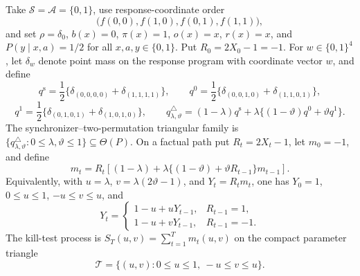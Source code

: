 Take \(\mathcal S=\mathcal A=\{0,1\}\), use response-coordinate order
\[
 \bigl(f(0,0),f(1,0),f(0,1),f(1,1)\bigr),
\]
and set \(\rho=\delta_0\), \(b(x)=0\), \(\pi(x)=1\), \(o(x)=x\), \(r(x)=x\), and \(P(y\mid x,a)=1/2\) for all \(x,a,y\in\{0,1\}\).  Put \(R_0=2X_0-1=-1\).  For \(w\in\{0,1\}^4\), let \(\delta_w\) denote point mass on the response program with coordinate vector \(w\), and define
\[
 q^{\mathrm s}=\frac12\{\delta_{(0,0,0,0)}+\delta_{(1,1,1,1)}\},\qquad
 q^{0}=\frac12\{\delta_{(0,0,1,0)}+\delta_{(1,1,0,1)}\},
\]
\[
 q^{1}=\frac12\{\delta_{(0,1,0,1)}+\delta_{(1,0,1,0)}\},\qquad
 q^{\triangle}_{\lambda,\vartheta}
 =(1-\lambda)q^{\mathrm s}
   +\lambda\{(1-\vartheta)q^0+\vartheta q^1\}.
\]
The synchronizer--two-permutation triangular family is
\(\{q^{\triangle}_{\lambda,\vartheta}:0\leq\lambda,\vartheta\leq1\}\subseteq\Theta(P)\).  On a factual path put \(R_t=2X_t-1\), let \(m_0=-1\), and define
\[
 m_t=R_t\left[(1-\lambda)+\lambda\{(1-\vartheta)+\vartheta R_{t-1}\}m_{t-1}\right].
\]
Equivalently, with \(u=\lambda\), \(v=\lambda(2\vartheta-1)\), and \(Y_t=R_tm_t\), one has \(Y_0=1\), \(0\leq u\leq1\), \(-u\leq v\leq u\), and
\[
 Y_t=
 \begin{cases}
  1-u+uY_{t-1},&R_{t-1}=1,\\
  1-u+vY_{t-1},&R_{t-1}=-1.
 \end{cases}
\]
The kill-test process is \(S_T(u,v)=\sum_{t=1}^T m_t(u,v)\) on the compact parameter triangle
\[
 \mathcal T=\{(u,v):0\leq u\leq1,\ -u\leq v\leq u\}.
\]

